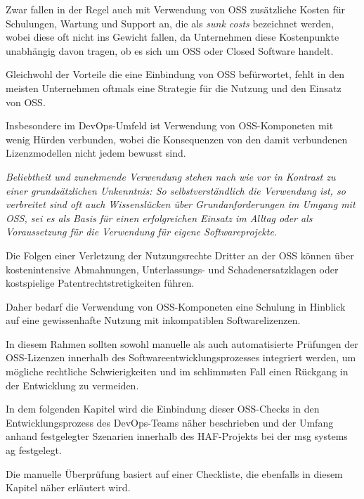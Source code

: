 Zwar fallen in der Regel auch mit Verwendung von OSS zusätzliche Kosten für Schulungen, Wartung und Support an, die als \emph{sunk costs} bezeichnet werden, wobei diese oft nicht ins Gewicht fallen, da Unternehmen diese Kostenpunkte unabhängig davon tragen, ob es sich um OSS oder Closed Software handelt. \cite{augsten_10_2019} 

Gleichwohl der Vorteile die eine Einbindung von OSS befürwortet, fehlt in den meisten Unternehmen oftmals eine Strategie für die Nutzung und den Einsatz von OSS. 

Insbesondere im DevOps-Umfeld ist Verwendung von OSS-Komponeten mit wenig Hürden verbunden, wobei die Konsequenzen von den damit verbundenen Lizenzmodellen nicht jedem bewusst sind. 

\textit{Beliebtheit und zunehmende Verwendung stehen nach wie vor in Kontrast zu einer grundsätzlichen Unkenntnis: So selbstverständlich die Verwendung ist, so verbreitet sind oft auch Wissenslücken über Grundanforderungen im Umgang mit OSS, sei es als Basis für einen erfolgreichen Einsatz im Alltag oder als Voraussetzung für die Verwendung für eigene Softwareprojekte.} \cite{bitkom_ev_open_2016}

Die Folgen einer Verletzung der Nutzungsrechte Dritter an der OSS können über kostenintensive Abmahnungen, Unterlassungs- und Schadenersatzklagen oder kostspielige Patentrechtstretigkeiten führen. 

Daher bedarf die Verwendung von OSS-Komponeten eine Schulung in Hinblick auf eine gewissenhafte Nutzung mit inkompatiblen Softwarelizenzen. 

In diesem Rahmen sollten sowohl manuelle als auch automatisierte Prüfungen der OSS-Lizenzen innerhalb des Softwareentwicklungsprozesses integriert werden, um mögliche rechtliche Schwierigkeiten und im schlimmsten Fall einen Rückgang in der Entwicklung zu vermeiden. 

In dem folgenden Kapitel wird die Einbindung dieser OSS-Checks in den Entwicklungsprozess des DevOps-Teams näher beschrieben und der Umfang anhand festgelegter Szenarien innerhalb des HAF-Projekts bei der msg systems ag festgelegt. 

Die manuelle Überprüfung basiert auf einer Checkliste, die ebenfalls in diesem Kapitel näher erläutert wird. 






















